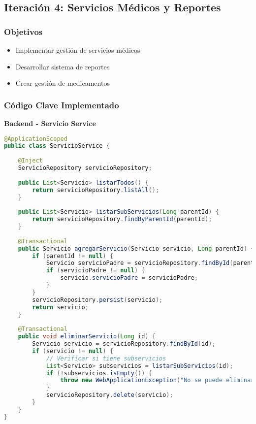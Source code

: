 \documentclass[12pt,a4paper]{article}
\begin{document}
\subsection{Iteración 4: Servicios Médicos y Reportes}

\subsubsection{Objetivos}
\begin{itemize}
    \item Implementar gestión de servicios médicos
    \item Desarrollar sistema de reportes
    \item Crear gestión de medicamentos
\end{itemize}

\subsubsection{Código Clave Implementado}

\textbf{Backend - Servicio Service}
\begin{lstlisting}[language=java]
@ApplicationScoped
public class ServicioService {
    
    @Inject
    ServicioRepository servicioRepository;
    
    public List<Servicio> listarTodos() {
        return servicioRepository.listAll();
    }
    
    public List<Servicio> listarSubServicios(Long parentId) {
        return servicioRepository.findByParentId(parentId);
    }
    
    @Transactional
    public Servicio agregarServicio(Servicio servicio, Long parentId) {
        if (parentId != null) {
            Servicio servicioPadre = servicioRepository.findById(parentId);
            if (servicioPadre != null) {
                servicio.servicioPadre = servicioPadre;
            }
        }
        servicioRepository.persist(servicio);
        return servicio;
    }
    
    @Transactional
    public void eliminarServicio(Long id) {
        Servicio servicio = servicioRepository.findById(id);
        if (servicio != null) {
            // Verificar si tiene subservicios
            List<Servicio> subservicios = listarSubServicios(id);
            if (!subservicios.isEmpty()) {
                throw new WebApplicationException("No se puede eliminar un servicio que tiene subservicios", Response.Status.BAD_REQUEST);
            }
            servicioRepository.delete(servicio);
        }
    }
}
\end{lstlisting}
\end{document}
